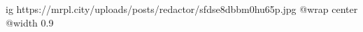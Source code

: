  
 
 
 
 

\ifcmt
  ig https://mrpl.city/uploads/posts/redactor/sfdse8dbbm0hu65p.jpg
  @wrap center
  @width 0.9
\fi
